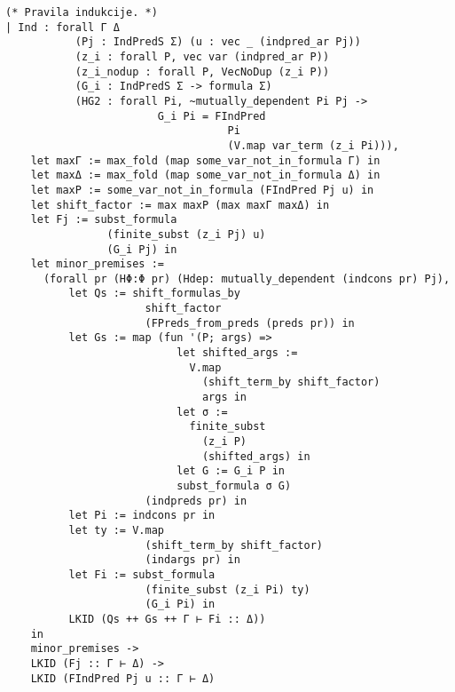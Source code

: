 \begin{verbatim}
(* Pravila indukcije. *)
| Ind : forall Γ Δ
           (Pj : IndPredS Σ) (u : vec _ (indpred_ar Pj))
           (z_i : forall P, vec var (indpred_ar P))
           (z_i_nodup : forall P, VecNoDup (z_i P))
           (G_i : IndPredS Σ -> formula Σ)
           (HG2 : forall Pi, ~mutually_dependent Pi Pj ->
                        G_i Pi = FIndPred
                                   Pi
                                   (V.map var_term (z_i Pi))),
    let maxΓ := max_fold (map some_var_not_in_formula Γ) in
    let maxΔ := max_fold (map some_var_not_in_formula Δ) in
    let maxP := some_var_not_in_formula (FIndPred Pj u) in
    let shift_factor := max maxP (max maxΓ maxΔ) in
    let Fj := subst_formula
                (finite_subst (z_i Pj) u)
                (G_i Pj) in
    let minor_premises :=
      (forall pr (HΦ:Φ pr) (Hdep: mutually_dependent (indcons pr) Pj),
          let Qs := shift_formulas_by
                      shift_factor
                      (FPreds_from_preds (preds pr)) in
          let Gs := map (fun '(P; args) =>
                           let shifted_args :=
                             V.map
                               (shift_term_by shift_factor)
                               args in
                           let σ :=
                             finite_subst
                               (z_i P)
                               (shifted_args) in
                           let G := G_i P in
                           subst_formula σ G)
                      (indpreds pr) in
          let Pi := indcons pr in
          let ty := V.map
                      (shift_term_by shift_factor)
                      (indargs pr) in
          let Fi := subst_formula
                      (finite_subst (z_i Pi) ty)
                      (G_i Pi) in
          LKID (Qs ++ Gs ++ Γ ⊢ Fi :: Δ))
    in
    minor_premises ->
    LKID (Fj :: Γ ⊢ Δ) ->
    LKID (FIndPred Pj u :: Γ ⊢ Δ)     
\end{verbatim}

